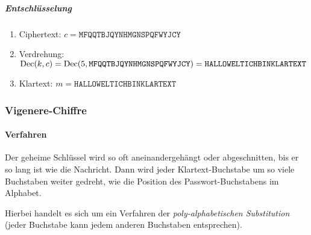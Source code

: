                    \subparagraph{Entschlüsselung}
	                    \begin{enumerate}
	                    	\item[] Ciphertext: \( c = \texttt{MFQQTBJQYNHMGNSPQFWYJCY} \)
	                    	\item Verdrehung: \( \operatorname{Dec}(k, c) = \operatorname{Dec}(5, \texttt{MFQQTBJQYNHMGNSPQFWYJCY}) = \texttt{HALLOWELTICHBINKLARTEXT} \)
	                    	\item[] Klartext: \( m = \texttt{HALLOWELTICHBINKLARTEXT} \)
	                    \end{enumerate}

            \subsubsection{Vigenere-Chiffre}
                \paragraph{Verfahren}
                    Der geheime Schlüssel wird so oft aneinandergehängt oder abgeschnitten, bis er so lang ist wie die Nachricht. Dann wird jeder Klartext-Buchstabe um so viele Buchstaben weiter gedreht, wie die Position des Passwort-Buchstabens im Alphabet.
                    
                    
                    Hierbei handelt es sich um ein Verfahren der \textit{poly-alphabetischen Substitution} (jeder Buchstabe kann jedem anderen Buchstaben entsprechen).
                    
